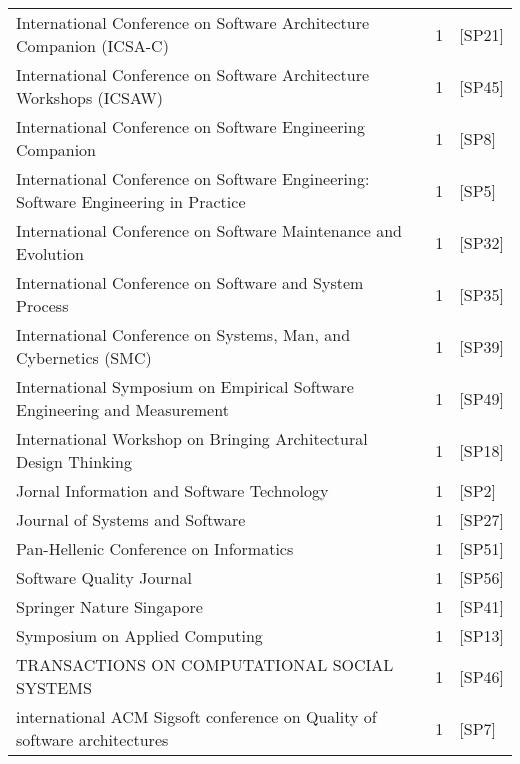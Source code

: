 \begin{tabular}{lrl}
 International Conference on Software Architecture Companion (ICSA-C) &  1 &  [SP21] \\
 International Conference on Software Architecture Workshops (ICSAW) &  1 &  [SP45] \\
 International Conference on Software Engineering Companion &  1 &  [SP8] \\
 International Conference on Software Engineering: Software Engineering in Practice &  1 &  [SP5] \\
 International Conference on Software Maintenance and Evolution &  1 &  [SP32] \\
 International Conference on Software and System Process &  1 &  [SP35] \\
 International Conference on Systems, Man, and Cybernetics (SMC) &  1 &  [SP39] \\
 International Symposium on Empirical Software Engineering and Measurement &  1 &  [SP49] \\
 International Workshop on Bringing Architectural Design Thinking &  1 &  [SP18] \\
 Jornal Information and Software Technology &  1 &  [SP2] \\
 Journal of Systems and Software &  1 &  [SP27] \\
 Pan-Hellenic Conference on Informatics &  1 &  [SP51] \\
 Software Quality Journal &  1 &  [SP56] \\
 Springer Nature Singapore &  1 &  [SP41] \\
 Symposium on Applied Computing &  1 &  [SP13] \\
 TRANSACTIONS ON COMPUTATIONAL SOCIAL SYSTEMS &  1 &  [SP46] \\
 international ACM Sigsoft conference on Quality of software architectures &  1 &  [SP7] \\
\bottomrule
\end{tabular}

